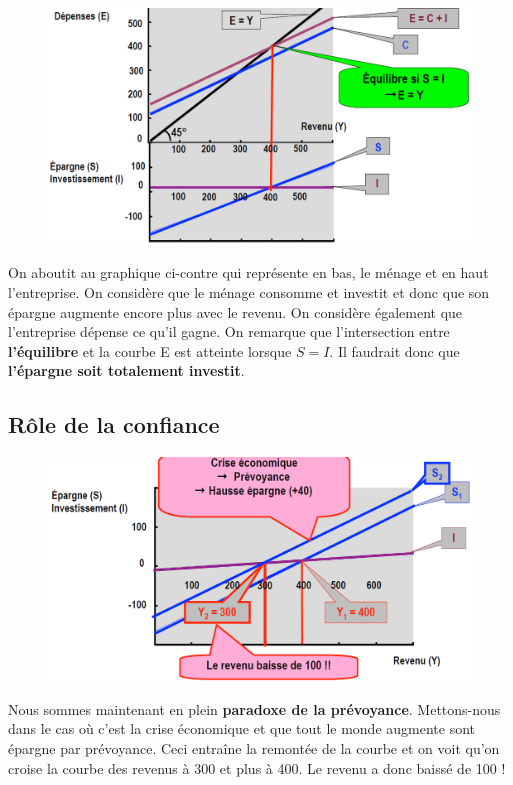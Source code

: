 \begin{figure}
	\includegraphics[scale=0.3]{55}
\end{figure}
On aboutit au graphique ci-contre qui représente en bas, le ménage et en haut l'entreprise. On considère que le ménage consomme et investit et donc que son épargne augmente encore plus avec le revenu. On considère également que l'entreprise dépense ce qu'il gagne. On remarque que l'intersection entre \textbf{l'équilibre} et la courbe E est atteinte lorsque $S = I$. Il faudrait donc que \textbf{l'épargne soit totalement investit}. 

\subsection{Rôle de la confiance}
\begin{figure}
	\includegraphics[scale=0.3]{56}
\end{figure}
Nous sommes maintenant en plein \textbf{paradoxe de la prévoyance}. Mettons-nous dans le cas où c'est la crise économique et que tout le monde augmente sont épargne par prévoyance. Ceci entraîne la remontée de la courbe et on voit qu'on croise la courbe des revenus à 300 et plus à 400. Le revenu a donc baissé de 100 ! 

